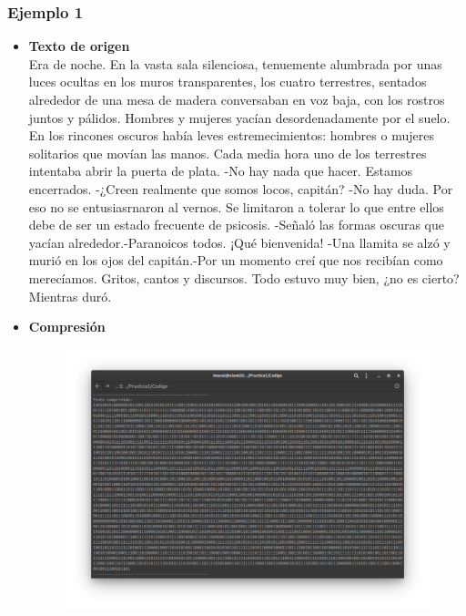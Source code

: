     \subsubsection{Ejemplo 1}
        \begin{itemize}
            \item \textbf{Texto de origen} \\
            Era de noche. En la vasta sala silenciosa, tenuemente alumbrada por unas luces ocultas en los muros transparentes, los cuatro terrestres, sentados alrededor de
una mesa de madera conversaban en voz baja, con los rostros juntos y pálidos.
Hombres y mujeres yacían desordenadamente por el suelo. En los rincones
oscuros había leves estremecimientos: hombres o mujeres solitarios que movían
las manos. Cada media hora uno de los terrestres intentaba abrir la puerta de
plata.
-No hay nada que hacer. Estamos encerrados.
-¿Creen realmente que somos locos, capitán?
-No hay duda. Por eso no se entusiasrnaron al vernos. Se limitaron a tolerar lo que
entre ellos debe de ser un estado frecuente de psicosis. -Señaló las formas
oscuras que yacían alrededor.-Paranoicos todos. ¡Qué bienvenida! -Una llamita se
alzó y murió en los ojos del capitán.-Por un momento creí que nos recibían como
merecíamos. Gritos, cantos y discursos. Todo estuvo muy bien, ¿no es cierto?
Mientras duró. 
            \item \textbf{Compresión} \\
                \begin{figure}[h!]
                    \centering
                    \includegraphics[width=17cm]{Huffman/ejemplos/ejemplo1/ej1-comp.png}
                \end{figure}

\end{itemize}
